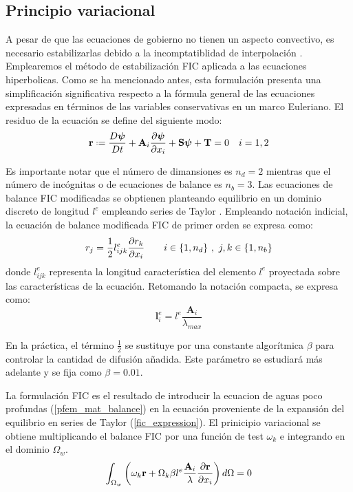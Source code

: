\subsection{Principio variacional}

A pesar de que las ecuaciones de gobierno no tienen un aspecto convectivo, es necesario estabilizarlas debido a la incomptatiblidad de interpolación \cite{codina2008}. Emplearemos el método de estabilización FIC \cite{onate1998} aplicada a las ecuaciones hiperbolicas. Como se ha mencionado antes, esta formulación presenta una simplificación significativa respecto a la fórmula general de las ecuaciones expresadas en términos de las variables conservativas en un marco Euleriano. El residuo de la ecuación se define del siguiente modo:
\begin{equation}
    \mathbf{r} \defeq \frac{D\bm{\psi}}{Dt} + \mathbf{A}_i\pder{\bm{\psi}}{x_i} + \mathbf{S}\bm{\psi} + \mathbf{T} = 0 \quad i = 1,2
\end{equation}

Es importante notar que el número de dimansiones es $n_d=2$ mientras que el número de incógnitas o de ecuaciones de balance es $n_b=3$. Las ecuaciones de balance FIC modificadas se obptienen planteando equilibrio en un dominio discreto de longitud $l^e$ empleando series de Taylor \cite{onate2001}. Empleando notación indicial, la ecuación de balance modificada FIC de primer orden se expresa como:
\begin{equation} \label{fic_expression}
    r_j = \frac{1}{2} l_{ijk}^e \pder{r_k}{x_i} \qquad i \in \{1,n_d\} \ , \ j,k \in \{1,n_b\}
\end{equation}
donde $l_{ijk}^e$ representa la longitud característica del elemento $l^e$ proyectada sobre las características de la ecuación. Retomando la notación compacta, se expresa como:
\begin{equation}
    \mathbf{l}_i^e = l^e \frac{\mathbf{A}_i}{\lambda_{max}}
\end{equation}

En la práctica, el término $\frac{1}{2}$ se sustituye por una constante algorítmica $\beta$ para controlar la cantidad de difusión añadida. Este parámetro se estudiará más adelante y se fija como $\beta=0.01$.

La formulación FIC es el resultado de introducir la ecuacion de aguas poco profundas (\ref{pfem_mat_balance}) en la ecuación proveniente de la expansión del equilibrio en series de Taylor (\ref{fic_expression}). El prinicipio variacional se obtiene multiplicando el balance FIC por una función de test $\omega_k$ e integrando en el dominio $\Omega_w$.
\begin{equation} \label{variational_fic_lagr}
    \int_{\Omega_w} \left(\omega_k \mathbf{r} + \Omega_k \beta l^e \frac{\mathbf{A}_i}{\lambda} \frac{\partial\mathbf{r}}{\partial x_i}\right) d\Omega = 0
\end{equation}


